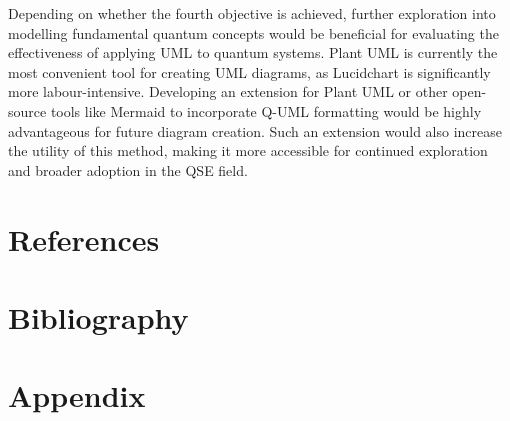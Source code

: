 \documentclass{article}
\begin{document}
Depending on whether the fourth objective is achieved, further exploration into modelling fundamental quantum concepts would be beneficial for evaluating the effectiveness of applying UML to quantum systems.
Plant UML is currently the most convenient tool for creating UML diagrams, as Lucidchart is significantly more labour-intensive. Developing an extension for Plant UML or other open-source tools like Mermaid to incorporate Q-UML formatting would be highly advantageous for future diagram creation. Such an extension would also increase the utility of this method, making it more accessible for continued exploration and broader adoption in the QSE field.

\section*{References}

\section{Bibliography}
\printbibliography

\section{Appendix}
\end{document}
